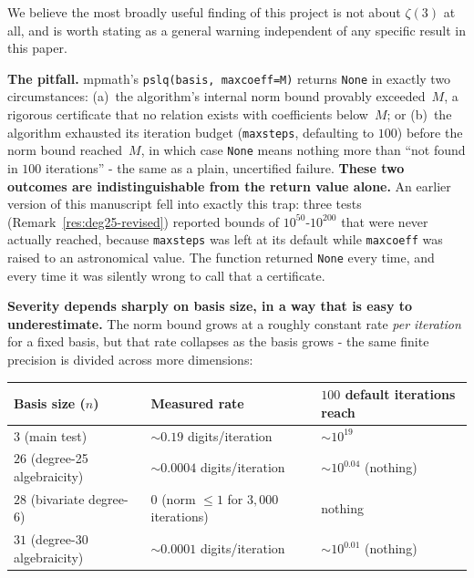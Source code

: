 \documentclass[12pt]{article}
\theoremstyle{definition}
\theoremstyle{remark}
\begin{document}
We believe the most broadly useful finding of this project is not
about $\zeta(3)$ at all, and is worth stating as a general warning
independent of any specific result in this paper.

\textbf{The pitfall.}  mpmath's \texttt{pslq(basis, maxcoeff=M)}
returns \texttt{None} in exactly two circumstances: (a)~the
algorithm's internal norm bound provably exceeded~$M$, a rigorous
certificate that no relation exists with coefficients below~$M$; or
(b)~the algorithm exhausted its iteration budget
(\texttt{maxsteps}, defaulting to $100$) before the norm bound
reached~$M$, in which case \texttt{None} means nothing more than
``not found in $100$ iterations'' - the same as a plain, uncertified
failure.  \textbf{These two outcomes are indistinguishable from the
return value alone.}  An earlier version of this manuscript fell into
exactly this trap: three tests (Remark~\ref{res:deg25-revised})
reported bounds of $10^{50}$-$10^{200}$ that were never actually
reached, because \texttt{maxsteps} was left at its default while
\texttt{maxcoeff} was raised to an astronomical value.  The function
returned \texttt{None} every time, and every time it was silently
wrong to call that a certificate.

\textbf{Severity depends sharply on basis size, in a way that is easy
to underestimate.}  The norm bound grows at a roughly constant rate
\emph{per iteration} for a fixed basis, but that rate collapses as the
basis grows - the same finite precision is divided across more
dimensions:

\begin{center}
\begin{tabular}{@{}lll@{}}
\toprule
Basis size ($n$) & Measured rate & $100$ default iterations reach \\
\midrule
$3$ (main test) & $\sim 0.19$ digits/iteration & $\sim 10^{19}$ \\
$26$ (degree-25 algebraicity) & $\sim 0.0004$ digits/iteration & $\sim 10^{0.04}$ (nothing) \\
$28$ (bivariate degree-6) & $0$ (norm $\le 1$ for $3{,}000$ iterations) & nothing \\
$31$ (degree-30 algebraicity) & $\sim 0.0001$ digits/iteration & $\sim 10^{0.01}$ (nothing) \\
\bottomrule
\end{tabular}
\end{center}
\end{document}
